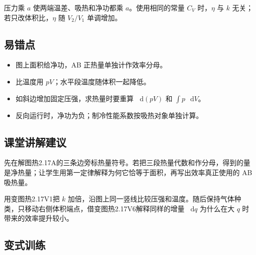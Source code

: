 \documentclass[UTF8,fontset=fandol,a4paper,11pt]{ctexart}
\newcommand{\dd}{\mathop{}\!\mathrm{d}}
\begin{document}
压力乘 $a$ 使两端温差、吸热和净功都乘 $a$。使用相同的常量 $C_V$ 时，$\eta$ 与 $k$ 无关；若只改体积比，$\eta$ 随 $V_2/V_1$ 单调增加。



\subsection*{易错点}

\begin{itemize}
\item 图上面积给净功，AB 正热量单独计作效率分母。
\item 比温度用 $pV$；水平段温度随体积一起降低。
\item 如斜边增加固定压强，求热量时要重算 $\dd(pV)$ 和 $\int p\,\dd V$。
\item 反向运行时，净功为负；制冷性能系数按吸热对象单独计算。
\end{itemize}



\subsection*{课堂讲解建议}

先在解图热2.17A的三条边旁标热量符号。若把三段热量代数和作分母，得到的量是净热量；让学生用第一定律解释为何它恰等于面积，再写出效率真正使用的 AB 吸热量。

用变图热2.17V1把 $k$ 加倍，沿图上同一竖线比较压强和温度。随后保持气体种类，只移动右侧体积端点，借变图热2.17V6解释同样的增量 $\dd q$ 为什么在大 $q$ 时带来的效率提升较小。



\subsection*{变式训练}
\end{document}
